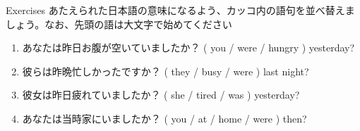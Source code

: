 \documentclass[aspectratio=169,xcolor={dvipsnames,table}]{beamer}
\newcommand{\myaudio}[1]{\href{#1}{\faVolumeUp}}
\begin{document}
\begin{frame}[plain]{Exercises}
あたえられた日本語の意味になるよう、カッコ内の語句を並べ替えましょう。なお、先頭の語は大文字で始めてください 
 \begin{enumerate}
	    \item あなたは昨日お腹が空いていましたか？
( you / were / hungry ) yesterday?\\
    \item 彼らは昨晩忙しかったですか？
( they / busy / were ) last night?\\
	    \item 彼女は昨日疲れていましたか？
( she / tired / was ) yesterday?\\
	    \item あなたは当時家にいましたか？
( you / at / home / were ) then?\\

 \end{enumerate}
\hfill{\scriptsize \myaudio{./audio/024_past_be_07.mp3}}

\end{frame}

\end{document}
